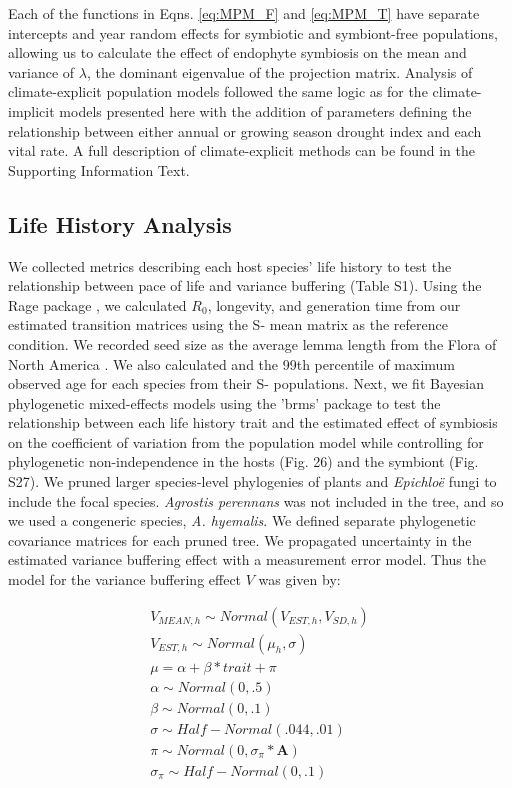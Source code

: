 \documentclass[9pt,twocolumn,twoside]{pnas-new}
\begin{document}
{Each of the functions in Eqns. \ref{eq:MPM_F} and \ref{eq:MPM_T} have separate intercepts and year random effects for symbiotic and symbiont-free populations, allowing us to calculate the effect of endophyte symbiosis on the mean and variance of $\lambda$, the dominant eigenvalue of the projection matrix. 
Analysis of climate-explicit population models followed the same logic as for the climate-implicit models presented here with the addition of parameters defining the relationship between either annual or growing season drought index and each vital rate. A full description of climate-explicit methods can be found in the Supporting Information Text.

\subsection*{Life History Analysis}

We collected metrics describing each host species' life history to test the relationship between pace of life and variance buffering (Table S1). 
Using the Rage package \cite{jones2022rcompadre}, we calculated $R_0$, longevity, and generation time from our estimated transition matrices using the S- mean matrix as the reference condition.
We recorded seed size as the average lemma length from the Flora of North America \cite{FloraNAonline}. 
We also calculated and the 99th percentile of maximum observed age for each species from their S- populations.
Next, we fit Bayesian phylogenetic mixed-effects models using the 'brms' package \cite{Burkner2017brms} to test the relationship between each life history trait and the estimated effect of symbiosis on the coefficient of variation from the population model while controlling for phylogenetic non-independence in the hosts (Fig. 26) and the symbiont (Fig. S27).
We pruned larger species-level phylogenies of plants\cite{zanne2014three} and \emph{Epichlo\"{e}} fungi \cite{leuchtmann2014nomenclatural} to include the focal species.
\emph{Agrostis perennans} was not included in the tree, and so we used a congeneric species, \emph{A. hyemalis}. 
We defined separate phylogenetic covariance matrices for each pruned tree.
We propagated uncertainty in the estimated variance buffering effect with a measurement error model.
Thus the model for the variance buffering effect $V$ was given by:

\begin{subequations}
	\begin{align}
		V_{MEAN,h} \sim Normal(V_{EST,h}, V_{SD,h})\\
		V_{EST,h} \sim Normal(\mu_h,\sigma)\\
		\mu = \alpha + \beta*trait + \pi \\
		\alpha \sim Normal(0,.5)\\
		\beta \sim Normal(0,.1)\\
		\sigma \sim Half-Normal(.044,.01)\\
		\pi \sim Normal(0,\sigma_{\pi}*\mathbf{A})\\
		\sigma_{\pi} \sim Half-Normal(0,.1)
	\end{align}
\end{subequations}

}
\end{document}
